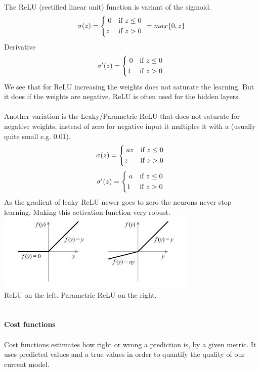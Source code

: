 \documentclass[12pt, letterpaper, twoside]{article}
\begin{document}
\newpage
\ \\
The ReLU (rectified linear unit) function is variant of the sigmoid.\\
\[
    \sigma(z) =
    \begin{dcases*}
  		\; 0 & if $z \leq 0 $ \\
  		z & if $z > 0$
	\end{dcases*}
	= max\{0, z\}
\]
Derivative\\
\[
    \sigma'(z) =
    \begin{dcases*}
  		\; 0 & if $z \leq 0 $ \\
  		1 & if $z > 0$
	\end{dcases*}
\]
We see that for ReLU increasing the weights does not saturate the learning. But it does if the weights are negative. ReLU is often used for the hidden layers.\\
\ \\
Another variation is the Leaky/Parametric ReLU that does not saturate for negative weights, instead of zero for negative input it multiples it with a (usually quite small e.g. 0.01).\\
\[
    \sigma(z) =
    \begin{dcases*}
  		\; az & if $z \leq 0 $ \\
  		z & if $z > 0$
	\end{dcases*}
\]
\[
    \sigma'(z) =
    \begin{dcases*}
  		\; a & if $z \leq 0 $ \\
  		1 & if $z > 0$
	\end{dcases*}
\]
As the gradient of leaky ReLU newer goes to zero the neurons never stop learning. Making this activation function very robust.\\
\includegraphics[scale=1]{"ReLU"}\\
ReLU on the left. Parametric ReLU on the right.\\
\ \\
\ \\
\textbf{Cost functions}\\
\ \\
Cost functions estimates how right or wrong a prediction is, by a given metric. It uses predicted values and a true values in order to quantify the quality of our current model. 
\end{document}
